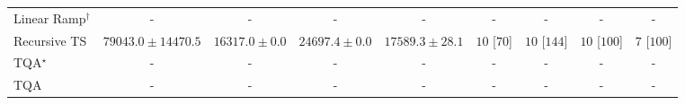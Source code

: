\begin{tabular}{l|cccc|cccc|}
Linear Ramp$^\dagger$ & {\cellcolor[HTML]{000000}} \color[HTML]{F1F1F1} {\cellcolor{white}} \color{black} - & {\cellcolor[HTML]{000000}} \color[HTML]{F1F1F1} {\cellcolor{white}} \color{black} - & {\cellcolor[HTML]{000000}} \color[HTML]{F1F1F1} {\cellcolor{white}} \color{black} - & {\cellcolor[HTML]{000000}} \color[HTML]{F1F1F1} {\cellcolor{white}} \color{black} - & {\cellcolor[HTML]{000000}} \color[HTML]{F1F1F1} {\cellcolor{white}} \color{black} - & {\cellcolor[HTML]{000000}} \color[HTML]{F1F1F1} {\cellcolor{white}} \color{black} - & {\cellcolor[HTML]{000000}} \color[HTML]{F1F1F1} {\cellcolor{white}} \color{black} - & {\cellcolor[HTML]{000000}} \color[HTML]{F1F1F1} {\cellcolor{white}} \color{black} - \\
Recursive TS & {\cellcolor[HTML]{00472A}} \color[HTML]{F1F1F1} $79043.0\pm 14470.5$ & {\cellcolor[HTML]{FCFED6}} \color[HTML]{000000} $16317.0\pm 0.0$ & {\cellcolor[HTML]{EDF8B1}} \color[HTML]{000000} $24697.4\pm 0.0$ & {\cellcolor[HTML]{FBFDCF}} \color[HTML]{000000} $17589.3\pm 28.1$ & {\cellcolor[HTML]{49006A}} \color[HTML]{F1F1F1} $10$ [$70$] & {\cellcolor[HTML]{49006A}} \color[HTML]{F1F1F1} $10$ [$144$] & {\cellcolor[HTML]{49006A}} \color[HTML]{F1F1F1} $10$ [$100$] & {\cellcolor[HTML]{CD238F}} \color[HTML]{F1F1F1} $7$ [$100$] \\
TQA$^\star$ & {\cellcolor[HTML]{000000}} \color[HTML]{F1F1F1} {\cellcolor{white}} \color{black} - & {\cellcolor[HTML]{000000}} \color[HTML]{F1F1F1} {\cellcolor{white}} \color{black} - & {\cellcolor[HTML]{000000}} \color[HTML]{F1F1F1} {\cellcolor{white}} \color{black} - & {\cellcolor[HTML]{000000}} \color[HTML]{F1F1F1} {\cellcolor{white}} \color{black} - & {\cellcolor[HTML]{000000}} \color[HTML]{F1F1F1} {\cellcolor{white}} \color{black} - & {\cellcolor[HTML]{000000}} \color[HTML]{F1F1F1} {\cellcolor{white}} \color{black} - & {\cellcolor[HTML]{000000}} \color[HTML]{F1F1F1} {\cellcolor{white}} \color{black} - & {\cellcolor[HTML]{000000}} \color[HTML]{F1F1F1} {\cellcolor{white}} \color{black} - \\
TQA & {\cellcolor[HTML]{000000}} \color[HTML]{F1F1F1} {\cellcolor{white}} \color{black} - & {\cellcolor[HTML]{000000}} \color[HTML]{F1F1F1} {\cellcolor{white}} \color{black} - & {\cellcolor[HTML]{000000}} \color[HTML]{F1F1F1} {\cellcolor{white}} \color{black} - & {\cellcolor[HTML]{000000}} \color[HTML]{F1F1F1} {\cellcolor{white}} \color{black} - & {\cellcolor[HTML]{000000}} \color[HTML]{F1F1F1} {\cellcolor{white}} \color{black} - & {\cellcolor[HTML]{000000}} \color[HTML]{F1F1F1} {\cellcolor{white}} \color{black} - & {\cellcolor[HTML]{000000}} \color[HTML]{F1F1F1} {\cellcolor{white}} \color{black} - & {\cellcolor[HTML]{000000}} \color[HTML]{F1F1F1} {\cellcolor{white}} \color{black} - \\

\end{tabular}
